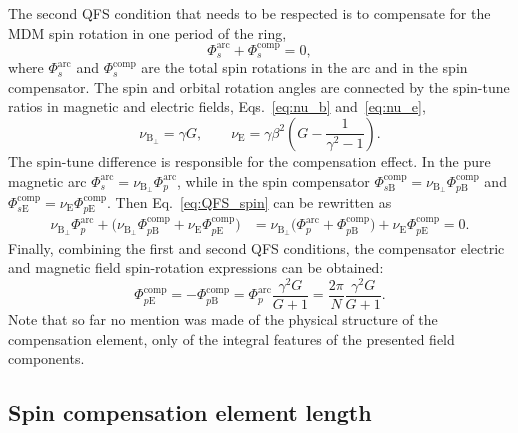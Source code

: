 The second QFS condition that needs to be respected is to compensate for the MDM
spin rotation in one period of the ring,
\begin{equation}
  \Phi_s^{\mathrm{arc}}+\Phi_{s}^{\mathrm{comp}}=0,
  \label{eq:QFS_spin}
\end{equation}
where $\Phi_s^{\mathrm{arc}}$ and $\Phi_{s}^{\mathrm{comp}}$ are the total spin
rotations in the arc and in the spin compensator. The spin and orbital rotation
angles are connected by the spin-tune ratios in magnetic and electric fields,
Eqs.~\eqref{eq:nu_b} and~\eqref{eq:nu_e},
\begin{equation}
  \nu_{\mathrm{B}_{\perp}} = \gamma G, \qquad
  \nu_{\mathrm{E}} = \gamma \beta^2 \left(G-\frac{1}{\gamma^{2}-1}\right).
  \label{eq:spin-tune}
\end{equation}
The spin-tune difference is responsible for the compensation effect. In the
pure magnetic arc $\Phi_{s}^{\mathrm{arc}} =
\nu_{\mathrm{B}_{\perp}}\Phi_{p}^{\mathrm{arc}}$, while in the spin compensator
$\Phi_{s\mathrm{B}}^{\mathrm{comp}} =
\nu_{\mathrm{B}_{\perp}}\Phi_{p\mathrm{B}}^{\mathrm{comp}}$ and
$\Phi_{s\mathrm{E}}^{\mathrm{comp}} =
\nu_{\mathrm{E}}\Phi_{p\mathrm{E}}^{\mathrm{comp}}$. Then
Eq.~\eqref{eq:QFS_spin} can be rewritten as
\begin{equation}
\begin{aligned}
  \nu_{\mathrm{B}_{\perp}}\Phi_{p}^{\mathrm{arc}} +
  \bigl(\nu_{\mathrm{B}_{\perp}}\Phi_{p\mathrm{B}}^{\mathrm{comp}} +
  \nu_{\mathrm{E}}\Phi_{p\mathrm{E}}^{\mathrm{comp}} \bigr)
  &=
  \nu_{\mathrm{B}_{\perp}} \bigl(
  \Phi_{p}^{\mathrm{arc}} +
  \Phi_{p\mathrm{B}}^{\mathrm{comp}} \bigr) +
  \nu_{\mathrm{E}}\Phi_{p\mathrm{E}}^{\mathrm{comp}}  = 0.
\end{aligned}
\label{eq:deflection_sum}
\end{equation}
Finally, combining the first and second QFS conditions, the compensator
electric and magnetic field spin-rotation expressions can be obtained:
\begin{equation}
  \Phi_{p\mathrm{E}}^{\mathrm{comp}} = - \Phi_{p\mathrm{B}}^{\mathrm{comp}}
  = {\Phi}_{p}^{\mathrm{arc}}\frac{\gamma^2 G}{G+1}
  =\frac{2\pi}{N}\frac{\gamma^2 G}{G+1}.
  \label{eq:deflection}
\end{equation}
Note that so far no mention was made of the physical structure of the
compensation element, only of the integral features of the presented field
components.

\subsection{Spin compensation element length}

